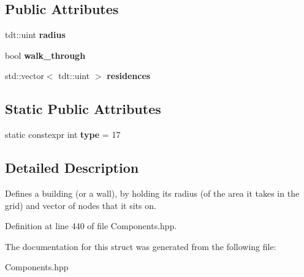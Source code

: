 \subsection*{Public Attributes}
\begin{DoxyCompactItemize}
\item 
tdt\+::uint {\bfseries radius}\hypertarget{struct_structure_component_a1ca0ec718c0c0c94e132194d54ff39c1}{}\label{struct_structure_component_a1ca0ec718c0c0c94e132194d54ff39c1}

\item 
bool {\bfseries walk\+\_\+through}\hypertarget{struct_structure_component_ad366ea0fb8acab2ca163bf427680ddd2}{}\label{struct_structure_component_ad366ea0fb8acab2ca163bf427680ddd2}

\item 
std\+::vector$<$ tdt\+::uint $>$ {\bfseries residences}\hypertarget{struct_structure_component_a476d7a4d964a344a0195563e252602c1}{}\label{struct_structure_component_a476d7a4d964a344a0195563e252602c1}

\end{DoxyCompactItemize}
\subsection*{Static Public Attributes}
\begin{DoxyCompactItemize}
\item 
static constexpr int {\bfseries type} = 17\hypertarget{struct_structure_component_afd9702d5889f23c1fb020e41cff8c3f7}{}\label{struct_structure_component_afd9702d5889f23c1fb020e41cff8c3f7}

\end{DoxyCompactItemize}


\subsection{Detailed Description}
Defines a building (or a wall), by holding it\textquotesingle{}s radius (of the area it takes in the grid) and vector of nodes that it sits on. 

Definition at line 440 of file Components.\+hpp.



The documentation for this struct was generated from the following file\+:\begin{DoxyCompactItemize}
\item 
Components.\+hpp\end{DoxyCompactItemize}
